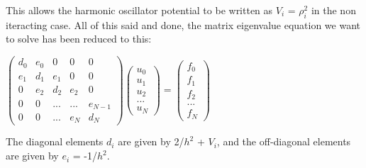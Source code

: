 \documentclass[10pt,showpacs,preprintnumbers,footinbib,amsmath,amssymb,aps,prl,twocolumn,groupedaddress,superscriptaddress,showkeys]{revtex4-1}
\begin{document}
This allows the harmonic oscillator potential to be written as $V_{i}$ = $\rho_{i}^{2}$ in the non iteracting case. All of this said and done, the matrix eigenvalue equation we want to solve has been reduced to this:
\begin{center}
		$\begin{pmatrix}
			d_{0}& e_{0} & 0 & 0 & 0\\
			e_{1} & d_{1} & e_{1} & 0 & 0\\
			0 & e_{2} & d_{2} & e_{2} & 0  \\
			0 & 0 & ... & ... & e_{N-1}   \\
			0 & 0 & ... & e_{N} & d_{N} 
	
		\end{pmatrix}
		 \begin{pmatrix}
			u_{0} \\
			u_{1} \\
			u_{2} \\
			... \\
			u_{N} 
		\end{pmatrix} =
		\begin{pmatrix}
			f_{0} \\
			f_{1} \\
			f_{2} \\
			... \\
			f_{N}
		\end{pmatrix}$
		\end{center}
The diagonal elements $d_{i}$ are given by 2/$h^{2}$ + $V_{i}$, and the off-diagonal elements are given by $e_{i}$ = -1/$h^{2}$.
\end{document}
